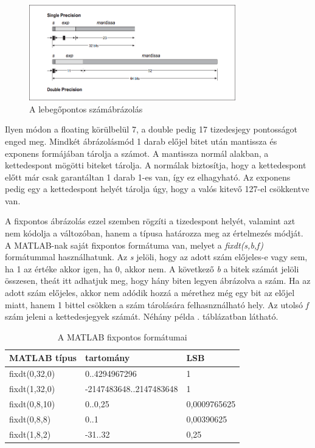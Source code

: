 \begin{figure}[H]
	\centering
	\includegraphics[width = 0.8\textwidth]{figures/floating.png}
	\caption{A lebegőpontos számábrázolás} 
	\label{fig:floating}
\end{figure}

Ilyen módon a floating körülbelül 7, a double pedig 17 tizedesjegy pontosságot enged meg. Mindkét ábrázolásmód 1 darab előjel bitet után mantissza és exponens formájában tárolja a számot. A mantissza normál alakban, a kettedespont mögötti biteket tárolja. A normálak biztosítja, hogy a kettedespont előtt már csak garantáltan 1 darab 1-es van, így ez elhagyható. Az exponens pedig egy a kettedespont helyét tárolja úgy, hogy a valós kitevő 127-el csökkentve van.

A fixpontos ábrázolás ezzel szemben rögzíti a tizedespont helyét, valamint azt nem kódolja a változóban, hanem a típusa határozza meg az értelmezés módját. A MATLAB-nak saját fixpontos formátuma van, melyet a \emph{fixdt(s,b,f)} formátummal használhatunk. Az \emph{s} jelöli, hogy az adott szám előjeles-e vagy sem, ha 1 az értéke akkor igen, ha 0, akkor nem. A következő \emph{b} a bitek számát jelöli összesen, theát itt adhatjuk meg, hogy hány biten legyen ábrázolva a szám. Ha az adott szám előjeles, akkor nem adódik hozzá a mérethez még egy bit az előjel miatt, hanem 1 bittel csökken a szám tárolására felhasnználható hely. Az utolsó \emph{f} szám jeleni a kettedesjegyek számát. Néhány példa . táblázatban látható. 

\begin{table}[]
\centering
\begin{tabular}{|l|l|l|}
\hline
MATLAB típus  & tartomány               & LSB \\ \hline
fixdt(0,32,0) & 0..4294967296           & 1   \\ \hline
fixdt(1,32,0) & -2147483648..2147483648	& 1   \\ \hline
fixdt(0,8,10) & 0..0,25        	   	    & 0,0009765625 \\ \hline
fixdt(0,8,8)  & 0..1     			 	& 0,00390625    \\ \hline
fixdt(1,8,2)  & -31..32     			& 0,25    \\ \hline
\end{tabular}
\caption{A MATLAB fixpontos formátumai}
\label{tab:fixdt}
\end{table}

